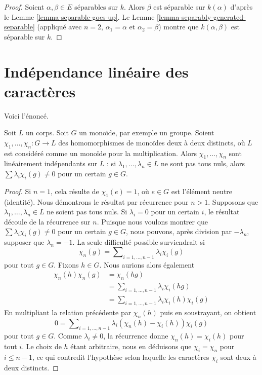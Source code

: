 \begin{proof}

Soient $\alpha, \beta \in E$ séparables sur $k$. Alors $\beta$ est séparable
sur $k(\alpha)$ d'après le Lemme \ref{lemma-separable-goes-up}.
Le Lemme \ref{lemma-separably-generated-separable} (appliqué avec $n = 2$,
$\alpha_1 = \alpha$ et $\alpha_2 = \beta$) montre que
$k(\alpha, \beta)$ est séparable sur $k$.

\end{proof}
\section{Indépendance linéaire des caractères}
\label{section-independence-characters}

\noindent
Voici l'énoncé.

\begin{lemma}
\label{lemma-independence-characters}
Soit $L$ un corps. Soit $G$ un monoïde, par exemple un groupe.
Soient
$\chi_1, \ldots, \chi_n : G \to L$ des homomorphismes de monoïdes deux à deux
distincts, où $L$ est considéré comme un monoïde pour la multiplication.
Alors $\chi_1, \ldots, \chi_n$ sont linéairement indépendants sur $L$ :
si $\lambda_1, \ldots, \lambda_n \in L$ ne sont pas tous nuls, alors
$\sum \lambda_i\chi_i(g) \not = 0$ pour un certain $g \in G$.
\end{lemma}

\begin{proof}
Si $n = 1$, cela résulte de $\chi_1(e) = 1$, où $e \in G$ est l'élément
neutre (identité). Nous démontrons le résultat par récurrence pour $n > 1$.
Supposons que $\lambda_1, \ldots, \lambda_n \in L$ ne soient pas tous nuls.
Si $\lambda_i = 0$ pour un certain $i$, le résultat découle de la récurrence sur $n$.
Puisque nous voulons montrer que $\sum \lambda_i\chi_i(g) \not = 0$
pour un certain $g \in G$, nous pouvons, après division par $-\lambda_n$,
supposer que $\lambda_n = -1$. La seule difficulté possible
surviendrait si
$$
\chi_n(g) = \sum\nolimits_{i = 1, \ldots, n - 1} \lambda_i\chi_i(g)
$$
pour tout $g \in G$. Fixons $h \in G$. Nous aurions alors également
\begin{align*}
\chi_n(h)\chi_n(g) & = \chi_n(hg) \\
& = \sum\nolimits_{i = 1, \ldots, n - 1} \lambda_i\chi_i(hg) \\
& = \sum\nolimits_{i = 1, \ldots, n - 1} \lambda_i\chi_i(h) \chi_i(g)
\end{align*}
En multipliant la relation précédente par $\chi_n(h)$ puis en soustrayant, on obtient
$$
0 = \sum\nolimits_{i = 1, \ldots, n - 1}
\lambda_i (\chi_n(h) - \chi_i(h)) \chi_i(g)
$$
pour tout $g \in G$. Comme $\lambda_i \not = 0$, la récurrence donne
$\chi_n(h) = \chi_i(h)$ pour tout $i$.
Le choix de $h$ étant arbitraire, nous en déduisons
que $\chi_i = \chi_n$ pour $i \leq n - 1$, ce qui contredit
l'hypothèse selon laquelle les caractères $\chi_i$ sont deux à deux distincts.
\end{proof}

